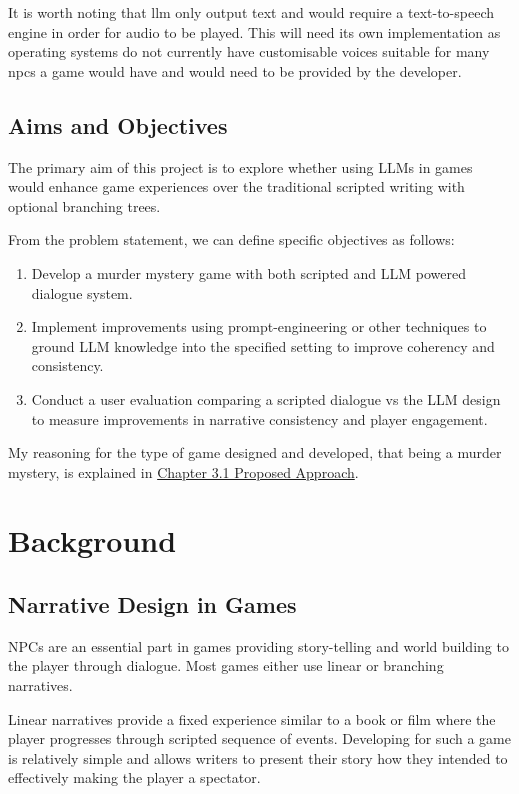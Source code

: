 \documentclass[12pt, a4paper]{report}
\begin{document}
	It is worth noting that \gls{llm} only output text and would require a text-to-speech engine in order for audio to be played. This will need its own implementation as operating systems do not currently have customisable voices suitable for many \gls{npc}s a game would have and would need to be provided by the developer.
	
	\section{Aims and Objectives}
	The primary aim of this project is to explore whether using LLMs in games would enhance game experiences over the traditional scripted writing with optional branching trees.
	
	From the problem statement, we can define specific objectives as follows:
	
	\begin{enumerate}
		\item Develop a murder mystery game with both scripted and LLM powered dialogue system.
		\item Implement improvements using prompt-engineering or other techniques to ground LLM knowledge into the specified setting to improve coherency and consistency.
		\item Conduct a user evaluation comparing a scripted dialogue vs the LLM design to measure improvements in narrative consistency and player engagement.
	\end{enumerate}
	
	My reasoning for the type of game designed and developed, that being a murder mystery, is explained in \hyperref[section:proposedapproach]{Chapter 3.1 Proposed Approach}.
	
	\chapter{Background}
	\section{Narrative Design in Games}
	NPCs are an essential part in games providing story-telling and world building to the player through dialogue. Most games either use linear or branching narratives.
	
	Linear narratives provide a fixed experience similar to a book or film where the player progresses through scripted sequence of events. Developing for such a game is relatively simple and allows writers to present their story how they intended to effectively making the player a spectator.
	
\end{document}
